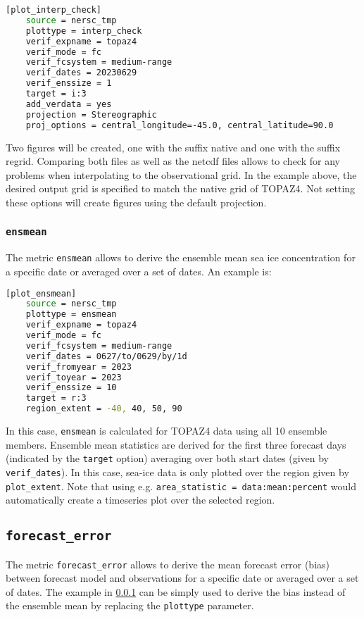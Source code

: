\documentclass[DIV=10, parskip=full]{scrreprt}
\begin{document}
\begin{lstlisting}[language=bash]
	[plot_interp_check]
	source = nersc_tmp
	plottype = interp_check
	verif_expname = topaz4
	verif_mode = fc
	verif_fcsystem = medium-range
	verif_dates = 20230629
	verif_enssize = 1
	target = i:3
	add_verdata = yes
	projection = Stereographic
	proj_options = central_longitude=-45.0, central_latitude=90.0
\end{lstlisting}

Two figures will be created, one with the suffix native and one with the suffix regrid. Comparing both files as well as the netcdf files allows to check for any problems when interpolating to the observational grid. In the example above, the desired output grid is specified to match the native grid of TOPAZ4. Not setting these options will create figures using the default projection.   

\subsubsection{\texttt{ensmean}}
\label{subsubsec:ensmean}
The metric \texttt{ensmean} allows to derive the ensemble mean sea ice concentration for a specific date or averaged over a set of dates. An example is:

\begin{lstlisting}[language=bash]
	[plot_ensmean]
	source = nersc_tmp
	plottype = ensmean
	verif_expname = topaz4
	verif_mode = fc
	verif_fcsystem = medium-range
	verif_dates = 0627/to/0629/by/1d
	verif_fromyear = 2023
	verif_toyear = 2023
	verif_enssize = 10
	target = r:3
	region_extent = -40, 40, 50, 90
\end{lstlisting}

In this case, \texttt{ensmean} is calculated for TOPAZ4 data using all 10 ensemble members. Ensemble mean statistics are derived for the first three forecast days (indicated by the \texttt{target} option) averaging over both start dates (given by \texttt{verif\_dates}). In this case, sea-ice data is only plotted over the region given by \texttt{plot\_extent}. Note that using e.g. \texttt{area\_statistic = data:mean:percent} would automatically create a timeseries plot over the selected region.

\subsection{\texttt{forecast\_error}}
The metric \texttt{forecast\_error} allows to derive the mean forecast error (bias) between forecast model and observations for a specific date or averaged over a set of dates. The example in \ref{subsubsec:ensmean} can be simply used to derive the bias instead of the ensemble mean by replacing the \texttt{plottype} parameter. 
\end{document}
